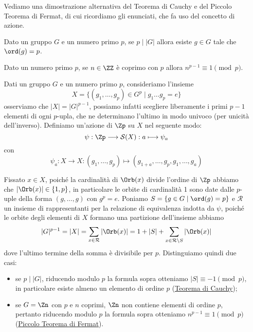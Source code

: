 \documentclass[11pt]{scrartcl}
\begin{document}
Vediamo una dimostrazione alternativa del Teorema di Cauchy e del Piccolo
Teorema di Fermat, di cui ricordiamo gli enunciati, che fa uso del concetto
 di azione. 

\begin{theorem}
    \label{teorema1.44}
    Dato un gruppo $G$ e un numero primo $p$, se $p\mid |G|$ allora esiste 
    $g \in G$ tale che $\ord(g) = p$.
\end{theorem}

\begin{theorem}
    \label{teorema1.45}
    Dato un numero primo $p$, se $n \in \ZZ$ è coprimo con $p$ allora 
    $n^{p - 1} \equiv 1 \pmod p$.
\end{theorem}

Dati un gruppo $G$ e un numero primo $p$, consideriamo l'insieme 
\[
    X = \{(g_1, \ldots, g_p) \in G^p\mid g_1\ldots g_p = e\}
\]osserviamo che $|X| = |G|^{p - 1}$, possiamo infatti scegliere liberamente
i primi $p - 1$ elementi di ogni $p$-upla, che ne determinano l'ultimo in 
modo univoco (per unicità dell'inverso). Definiamo un'azione di $\Zp$ su $X$
nel seguente modo:
\[
    \psi: \Zp \longrightarrow \mathcal{S}(X) : a \longmapsto \psi_a
\]
con
\[
    \psi_a:X\longrightarrow X : (g_1, \ldots, g_p)\longmapsto (g_{1 + a}, \ldots, g_p, g_1, \ldots, g_a)
\]

Fissato $x \in X$, poiché la cardinalità di $\Orb(x)$ divide l'ordine di $\Zp$
abbiamo che $|\Orb(x)| \in \{1, p\}$, in particolare le orbite di cardinalità
1 sono date dalle $p$-uple della forma $(g, \ldots, g)$ con $g^p = e$.
Poniamo $S = \{g\in G \mid \ord(g) = p\}$ e $\mathcal{R}$ un insieme di 
rappresentanti per la relazione di equivalenza indotta da $\psi$, poiché 
le orbite degli elementi di $X$ formano una partizione dell'insieme abbiamo
\[
    |G|^{p - 1} = |X| = \sum_{x \in \mathcal{R}} |\Orb(x)| = 1 + |S| + \sum_{x \in \mathcal{R}\setminus S}|\Orb(x)|
\]dove l'ultimo termine della somma è divisibile per $p$. Distinguiamo 
quindi due casi:
\begin{itemize}
    \item se $p\mid |G|$, riducendo modulo $p$ la formula sopra otteniamo
    $|S| \equiv -1 \pmod p$, in particolare esiste almeno un elemento di
    ordine $p$ (\hyperref[teorema1.44]{Teorema di Cauchy});
    \item se $G = \Zn$ con $p$ e $n$ coprimi, $\Zn$ non contiene elementi
    di ordine $p$, pertanto riducendo modulo $p$ la formula sopra otteniamo
    $n^{p - 1} \equiv 1 \pmod p$ (\hyperref[teorema1.45]{Piccolo Teorema di Fermat}).
\end{itemize}
\end{document}
